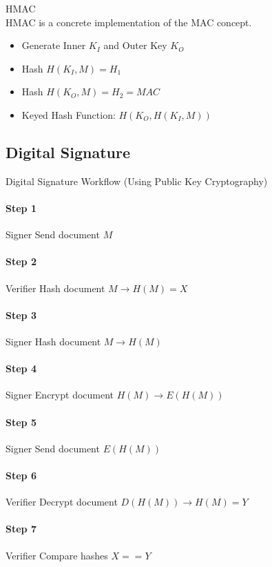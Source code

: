 \begin{concept}{HMAC}\\
    HMAC is a concrete implementation of the MAC concept.
    \begin{itemize}
        \item Generate Inner $K_I$ and Outer Key $K_O$
        \item Hash $H(K_I, M) = H_1$
        \item Hash $H(K_O, M) = H_2 = MAC$
        \item Keyed Hash Function: $H(K_O, H(K_I, M))$
    \end{itemize}
\end{concept}

\subsection{Digital Signature}

\begin{KR}{Digital Signature Workflow (Using Public Key Cryptography)}\\
    \paragraph{Step 1} Signer Send document $M$
    \paragraph{Step 2} Verifier Hash document $M \rightarrow H(M) = X$
    \paragraph{Step 3} Signer Hash document $M \rightarrow H(M)$
    \paragraph{Step 4} Signer Encrypt document $H(M) \rightarrow E(H(M))$
    \paragraph{Step 5} Signer Send document $E(H(M))$
    \paragraph{Step 6} Verifier Decrypt document $D(H(M)) \rightarrow H(M) = Y$
    \paragraph{Step 7} Verifier Compare hashes $X == Y$
\end{KR}

